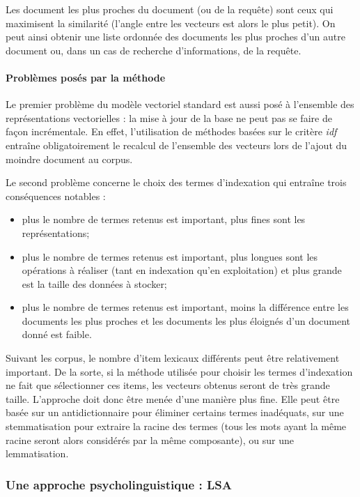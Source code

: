 Les document les plus proches du document (ou de la requête) sont ceux
qui maximisent la similarité (l'angle entre les vecteurs est alors le
plus petit). On peut ainsi obtenir une liste ordonnée des documents
les plus proches d'un autre document ou, dans un cas de recherche
d'informations, de la requête.


\paragraph{Problèmes posés par la méthode}

Le premier problème du modèle vectoriel standard est aussi posé à
l'ensemble des représentations vectorielles : la mise à jour de la
base ne peut pas se faire de façon incrémentale. En effet,
l'utilisation de méthodes basées sur le critère \emph{idf} entraîne
obligatoirement le recalcul de l'ensemble des vecteurs lors de l'ajout
du moindre document au corpus.

Le second problème concerne le choix des termes d'indexation qui
entraîne trois conséquences notables :
\begin{itemize}
\item plus le nombre de termes retenus est important, plus fines sont
  les représentations;
\item plus le nombre de termes retenus est important, plus longues
  sont les opérations à réaliser (tant en indexation qu'en
  exploitation) et plus grande est la taille des données à stocker;
\item plus le nombre de termes retenus est important, moins la
  différence entre les documents les plus proches et les documents les
  plus éloignés d'un document donné est faible.
\end{itemize}

Suivant les corpus, le nombre d'item lexicaux différents peut être
relativement important. De la sorte, si la méthode utilisée pour
choisir les termes d'indexation ne fait que sélectionner ces items,
les vecteurs obtenus seront de très grande taille. L'approche doit
donc être menée d'une manière plus fine. Elle peut être basée sur un
antidictionnaire pour éliminer certains termes inadéquats, sur une
stemmatisation pour extraire la racine des termes (tous les mots ayant
la même racine seront alors considérés par la même composante), ou sur
une lemmatisation.


\subsubsection{Une approche psycholinguistique : LSA}

